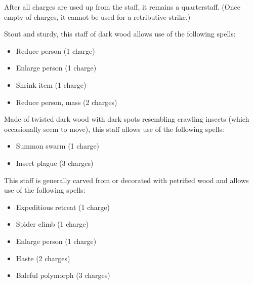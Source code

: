 After all charges are used up from the staff, it remains a  quarterstaff. (Once empty of charges, it cannot be used for a retributive strike.)


 Stout and sturdy, this staff of dark wood allows use of the following spells:
\begin{itemize}
\item Reduce person (1 charge)
\item Enlarge person (1 charge)
\item Shrink item (1 charge)
\item Reduce person, mass (2 charges)
\end{itemize}


 Made of twisted dark wood with dark spots resembling crawling insects (which occasionally seem to move), this staff allows use of the following spells:
\begin{itemize}
\item Summon swarm (1 charge)
\item Insect plague (3 charges)
\end{itemize}


 This staff is generally carved from or decorated with petrified wood and allows use of the following spells:
\begin{itemize}
\item Expeditious retreat (1 charge)
\item Spider climb (1 charge)
\item Enlarge person (1 charge)
\item Haste (2 charges)
\item Baleful polymorph (3 charges)
\end{itemize}


